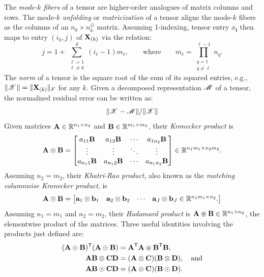 The \emph{mode-$k$ fibers} of a tensor are higher-order analogues
of matrix columns and rows.
The mode-$k$ \emph{unfolding} or \emph{matricization} of a tensor 
aligns the mode-$k$ fibers as the columns of an $n_k \times n_k^\oslash$ matrix. 
Assuming 1-indexing, tensor entry $x_{\mathbf{i}}$ then maps to
entry $(i_k, j)$ of $\M{X}_{(k)}$ via the relation: 
\begin{equation}
  \label{eqn:unfoldmapping}
  j = 1+\sum_{\substack{\ell=1\\\ell\neq k}}^d (i_\ell -1)m_\ell, \qquad \text{where} \qquad m_\ell = \prod_{\substack{q=1\\q\neq \ell}}^{\ell-1} n_q.
\end{equation}
The \emph{norm} of a tensor is the square root of the sum of its squared entries, 
e.g., $\|\T{X}\| = \|\M{X}_{(k)}\|_F$ for any $k$. Given a decomposed representation $\T{M}$ of a tensor,
the normalized residual error can be written as:
\begin{equation}
\|\T{X}-\T{M}\|/{\|\T{X}\|}
\end{equation}
Given matrices $\M{A} \in \mathbb{R}^{n_1 \times n_2}$ and $\M{B} \in \mathbb{R}^{m_1
  \times m_2}$, their \emph{Kronecker product} is 
\begin{displaymath}
  \M{A} \otimes \M{B} =
  \begin{bmatrix}
    a_{11} \M{B} & a_{12} \M{B} & \cdots & a_{1n_2} \M{B} \\
    \vdots & \vdots & \ddots & \vdots \\
    a_{n_1 1} \M{B} & a_{n_1 2} \M{B} & \cdots & a_{n_1 n_2} \M{B} \\
  \end{bmatrix}
  \in \R^{n_1 m_1 \times n_2 m_2}.
\end{displaymath}
%
Assuming $n_2 = m_2$, their \emph{Khatri-Rao product}, also known as the
\emph{matching columnwise Kronecker product}, is
\begin{displaymath}
  \M{A} \odot \M{B} = 
  \begin{bmatrix}
    \V{a}_1 \otimes \V{b}_1 & \V{a}_2 \otimes \V{b}_2
    & \cdots &  \V{a}_J \otimes \V{b}_J \in \mathbb{R}^{n_1 m_1 \times n_2}.   
  \end{bmatrix}
\end{displaymath}
Assuming $n_1=m_1$ and $n_2=m_2$, their \emph{Hadamard product} is
$\M{A}\circledast\M{B} \in \mathbb{R}^{n_1 \times n_2}$, the elementwise product of the matrices.
Three useful identities involving the products just defined are:
\begin{align}
(\M{A} \odot \M{B})^\trans(\M{A} \odot \M{B}) &= \M{A}^\trans\M{A} \circledast \M{B}^\trans\M{B}, \label{eq:KRGram} \\ 
\M{A}\M{B} \otimes \M{C}\M{D} &= (\M{A} \otimes \M{C})(\M{B} \otimes \M{D}) \label{eqn:krondist},\quad\text{and} \\
\M{A}\M{B} \odot \M{C}\M{D} &= (\M{A} \otimes \M{C})(\M{B} \odot \M{D}). \label{eqn:krdist}
\end{align}


